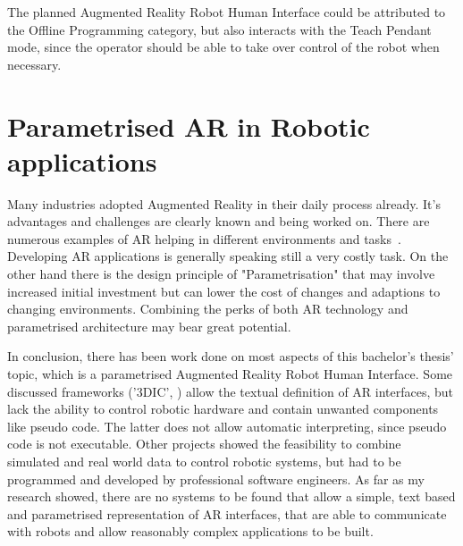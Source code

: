 The planned Augmented Reality Robot Human Interface could be attributed to the Offline Programming category, but also interacts with the Teach Pendant mode, since the operator should be able to take over control of the robot when necessary.

\section{Parametrised AR in Robotic applications}

Many industries adopted Augmented Reality in their daily process already. It's advantages and challenges are clearly known and being worked on. There are numerous examples of AR helping in different environments and tasks~\cite{DiegmannBenefitsAREdu, SalaminBenefitsAR, ARInMilRepair}. Developing AR applications is generally speaking still a very costly task. On the other hand there is the design principle of "Parametrisation" that may involve increased initial investment but can lower the cost of changes and adaptions to changing environments. Combining the perks of both AR technology and parametrised architecture may bear great potential.

In conclusion, there has been work done on most aspects of this bachelor's thesis' topic, which is a parametrised Augmented Reality Robot Human Interface. Some discussed frameworks ('3DIC', \cite{figueroa2006conceptual}) allow the textual definition of AR interfaces, but lack the ability to control robotic hardware and contain unwanted components like pseudo code. The latter does not allow automatic interpreting, since pseudo code is not executable. Other projects showed the feasibility to combine simulated and real world data to control robotic systems, but had to be programmed and developed by professional software engineers. As far as my research showed, there are no systems to be found that allow a simple, text based and parametrised representation of AR interfaces, that are able to communicate with robots and allow reasonably complex applications to be built.












